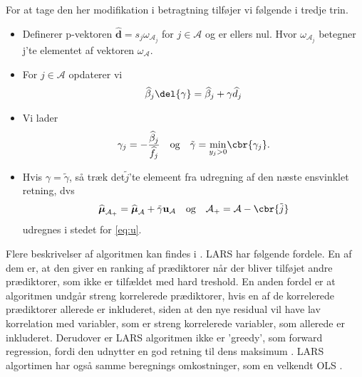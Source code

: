 For at tage den her modifikation i betragtning tilføjer vi følgende i tredje trin. 
\begin{itemize}
\item Definerer p-vektoren $\widehat{\textbf{d}} = s_j \omega_{\mathcal{A}_j}$ for $j \in \mathcal{A}$ og er ellers nul. Hvor $ \omega_{\mathcal{A}_j}$ betegner j'te elementet af vektoren $\omega_{\mathcal{A}}$. 
\item For $j \in \mathcal{A}$ opdaterer vi 
\begin{align*}
\widehat{\beta}_j \del{\gamma} = \widehat{\beta}_j + \gamma \widehat{d}_j 
\end{align*}
\item Vi lader 
\begin{align*}
\gamma_j = - \frac{\widehat{\beta}_j}{\widehat{f}_j} \quad \text{og} \quad \tilde\gamma = \underset{y_j > 0}{\min} \cbr{\gamma_j}. 
\end{align*}
\item Hvis $\gamma = \tilde{\gamma}$, så træk det$ \tilde{j}$'te elemeent fra udregning af den næste ensvinklet retning, dvs 
\begin{align*}
\widehat{\boldsymbol\mu}_{\mathcal{A}_+} = \widehat{\boldsymbol\mu}_\mathcal{A} + \tilde{\gamma} \textbf{u}_\mathcal{A} \quad \text{og} \quad \mathcal{A_+} = \mathcal{A}- \cbr{\tilde{j}}
\end{align*}
udregnes i stedet for \eqref{eq:u}.
\end{itemize}

Flere beskrivelser af algoritmen kan findes i \citep{efron}. 
LARS har følgende fordele.
En af dem er, at den giver en ranking af prædiktorer når der bliver tilføjet andre prædiktorer, som ikke er tilfældet med hard treshold. 
En anden fordel er at algoritmen undgår streng korrelerede prædiktorer, hvis en af de korrelerede prædiktorer allerede er inkluderet, siden at den nye residual vil have lav korrelation med variabler, som er streng korrelerede variabler, som allerede er inkluderet. 
Derudover er LARS algoritmen ikke er 'greedy', som forward regression, fordi den udnytter en god retning til dens maksimum . 
LARS algortimen har også samme beregnings omkostninger, som en velkendt OLS \citep{hui_hastie}. 

